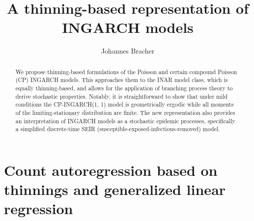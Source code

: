 \documentclass{article}
\begin{document}
\title{A thinning-based representation of INGARCH models}
\author{Johannes Bracher}


\newcommand{\juv}{E}

\maketitle


\begin{abstract}
We propose thinning-based formulations of the Poisson and certain compound Poisson (CP) INGARCH models. This approaches them to the INAR model class, which is equally thinning-based, and allows for the application of branching process theory to derive stochastic properties. Notably, it is straightforward to show that under mild conditions the CP-INGARCH(1, 1) model is geometrically ergodic while all moments of the limiting-stationary distribution are finite. The new representation also provides an interpretation of INGARCH models as a stochastic epidemic processes, specifically a simplified discrete-time SEIR (susceptible-exposed-infectious-removed) model.
\end{abstract}



\section{Count autoregression based on thinnings and generalized linear regression}
\label{sec:intro}
\end{document}
